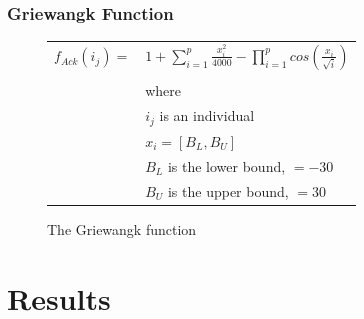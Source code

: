 \documentclass[12pt]{article}
\begin{document}
\section{Griewangk Function}
\begin{figure}[!h]
        \begin{center}
		\begin{tabular}{r l}
			$ f_{Ack}(i_j) = $		&	$ 1 + \sum_{i=1}^{p} \frac{x_i^2}{4000} - \prod_{i=1}^{p} cos(\frac{x_i}{\sqrt{i}}) $\\
								& \\
								&	where \\
								&	$ i_j $ is an individual \\
								&	$ x_i = [B_L, B_U] $ \\
								& 	$ B_L $ is the lower bound, $ = -30 $ \\
								& 	$ B_U $ is the upper bound, $ = 30 $\\

		\end{tabular} 
               \caption{The Griewangk function}
                \label{griewangk}
        \end{center}
\end{figure}


\pagebreak

\part{Results}
\end{document}
